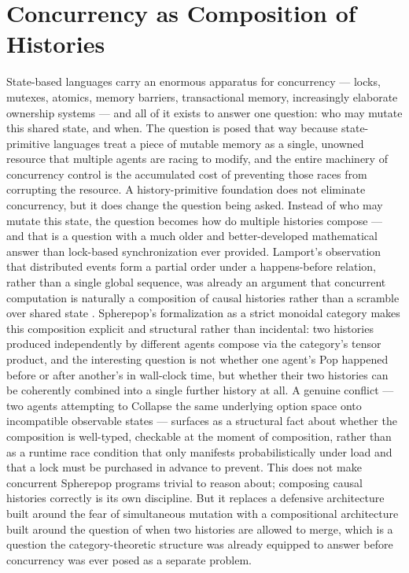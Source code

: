 \documentclass[11pt]{article}
\begin{document}
\section{Concurrency as Composition of Histories}

State-based languages carry an enormous apparatus for concurrency --- locks, mutexes, atomics, memory barriers, transactional memory, increasingly elaborate ownership systems --- and all of it exists to answer one question: who may mutate this shared state, and when. The question is posed that way because state-primitive languages treat a piece of mutable memory as a single, unowned resource that multiple agents are racing to modify, and the entire machinery of concurrency control is the accumulated cost of preventing those races from corrupting the resource. A history-primitive foundation does not eliminate concurrency, but it does change the question being asked. Instead of who may mutate this state, the question becomes how do multiple histories compose --- and that is a question with a much older and better-developed mathematical answer than lock-based synchronization ever provided. Lamport's observation that distributed events form a partial order under a happens-before relation, rather than a single global sequence, was already an argument that concurrent computation is naturally a composition of causal histories rather than a scramble over shared state \cite{lamport1978}. Spherepop's formalization as a strict monoidal category makes this composition explicit and structural rather than incidental: two histories produced independently by different agents compose via the category's tensor product, and the interesting question is not whether one agent's Pop happened before or after another's in wall-clock time, but whether their two histories can be coherently combined into a single further history at all. A genuine conflict --- two agents attempting to Collapse the same underlying option space onto incompatible observable states --- surfaces as a structural fact about whether the composition is well-typed, checkable at the moment of composition, rather than as a runtime race condition that only manifests probabilistically under load and that a lock must be purchased in advance to prevent. This does not make concurrent Spherepop programs trivial to reason about; composing causal histories correctly is its own discipline. But it replaces a defensive architecture built around the fear of simultaneous mutation with a compositional architecture built around the question of when two histories are allowed to merge, which is a question the category-theoretic structure was already equipped to answer before concurrency was ever posed as a separate problem.
\end{document}

